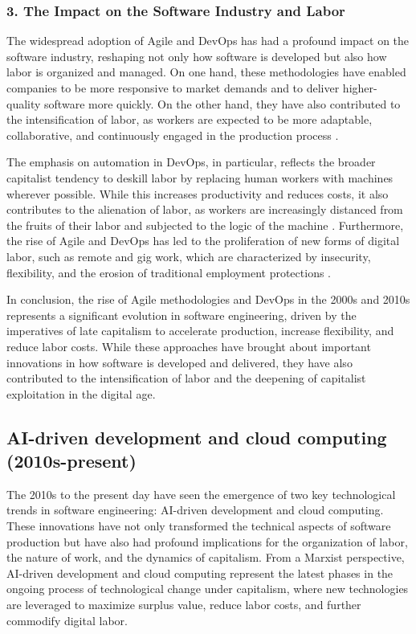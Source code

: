 \begin{refsection}
\begin{multicols}{2}
{\subsubsection*{3. The Impact on the Software Industry and Labor}

The widespread adoption of Agile and DevOps has had a profound impact on the software industry, reshaping not only how software is developed but also how labor is organized and managed. On one hand, these methodologies have enabled companies to be more responsive to market demands and to deliver higher-quality software more quickly. On the other hand, they have also contributed to the intensification of labor, as workers are expected to be more adaptable, collaborative, and continuously engaged in the production process \cite{fuchs2014digital}.

The emphasis on automation in DevOps, in particular, reflects the broader capitalist tendency to deskill labor by replacing human workers with machines wherever possible. While this increases productivity and reduces costs, it also contributes to the alienation of labor, as workers are increasingly distanced from the fruits of their labor and subjected to the logic of the machine \cite{braverman1974labor}. Furthermore, the rise of Agile and DevOps has led to the proliferation of new forms of digital labor, such as remote and gig work, which are characterized by insecurity, flexibility, and the erosion of traditional employment protections \cite{scholz2013digital}.

In conclusion, the rise of Agile methodologies and DevOps in the 2000s and 2010s represents a significant evolution in software engineering, driven by the imperatives of late capitalism to accelerate production, increase flexibility, and reduce labor costs. While these approaches have brought about important innovations in how software is developed and delivered, they have also contributed to the intensification of labor and the deepening of capitalist exploitation in the digital age.

}
\subsection{AI-driven development and cloud computing (2010s-present)}
{\small
The 2010s to the present day have seen the emergence of two key technological trends in software engineering: AI-driven development and cloud computing. These innovations have not only transformed the technical aspects of software production but have also had profound implications for the organization of labor, the nature of work, and the dynamics of capitalism. From a Marxist perspective, AI-driven development and cloud computing represent the latest phases in the ongoing process of technological change under capitalism, where new technologies are leveraged to maximize surplus value, reduce labor costs, and further commodify digital labor.

}
\end{multicols}
\end{refsection}
